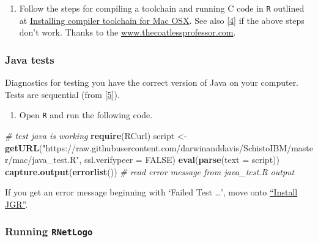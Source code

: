 \documentclass[10,portrait]{article}
\newenvironment{Shaded}{\begin{snugshade}}{\end{snugshade}}
\newcommand{\KeywordTok}[1]{\textcolor[rgb]{0.13,0.29,0.53}{\textbf{#1}}}
\newcommand{\DataTypeTok}[1]{\textcolor[rgb]{0.13,0.29,0.53}{#1}}
\newcommand{\StringTok}[1]{\textcolor[rgb]{0.31,0.60,0.02}{#1}}
\newcommand{\CommentTok}[1]{\textcolor[rgb]{0.56,0.35,0.01}{\textit{#1}}}
\newcommand{\OtherTok}[1]{\textcolor[rgb]{0.56,0.35,0.01}{#1}}
\newcommand{\NormalTok}[1]{#1}
\providecommand{\tightlist}{%
  \setlength{\itemsep}{0pt}\setlength{\parskip}{0pt}}
\begin{document}
\begin{enumerate}
\def\labelenumi{\arabic{enumi}.}
\tightlist
\item
  Follow the steps for compiling a toolchain and running C code in
  \texttt{R} outlined at
  \href{https://thecoatlessprofessor.com/programming/r-compiler-tools-for-rcpp-on-macos/}{Installing
  compiler toolchain for Mac OSX}. See also
  \protect\hyperlink{references}{{[}4{]}} if the above steps don't work.
  Thanks to the \url{www.thecoatlessprofessor.com}.
\end{enumerate}

\subsubsection{Java tests}\label{java-tests}

Diagnostics for testing you have the correct version of Java on your
computer. Tests are sequential (from
\protect\hyperlink{references}{{[}5{]}}).

\begin{enumerate}
\def\labelenumi{\arabic{enumi}.}
\tightlist
\item
  Open \texttt{R} and run the following code.
\end{enumerate}

\begin{Shaded}
\begin{Highlighting}[]
\CommentTok{# test java is working}
\KeywordTok{require}\NormalTok{(RCurl)}
\NormalTok{script <-}\StringTok{ }\KeywordTok{getURL}\NormalTok{(}\StringTok{"https://raw.githubusercontent.com/darwinanddavis/SchistoIBM/master/mac/java_test.R"}\NormalTok{, }\DataTypeTok{ssl.verifypeer =} \OtherTok{FALSE}\NormalTok{)}
\KeywordTok{eval}\NormalTok{(}\KeywordTok{parse}\NormalTok{(}\DataTypeTok{text =}\NormalTok{ script))}
\KeywordTok{capture.output}\NormalTok{(}\KeywordTok{errorlist}\NormalTok{()) }\CommentTok{# read error message from java_test.R output}
\end{Highlighting}
\end{Shaded}

If you get an error message beginning with `Failed Test \ldots{}', move
onto \protect\hyperlink{install-jgr}{``Install JGR''}.

\subsubsection{\texorpdfstring{Running
\texttt{RNetLogo}}{Running RNetLogo}}\label{running-rnetlogo}
\end{document}

